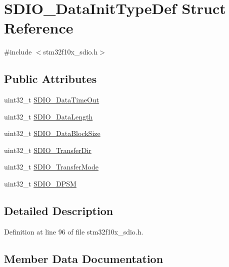 \hypertarget{struct_s_d_i_o___data_init_type_def}{}\section{S\+D\+I\+O\+\_\+\+Data\+Init\+Type\+Def Struct Reference}
\label{struct_s_d_i_o___data_init_type_def}


{\ttfamily \#include $<$stm32f10x\+\_\+sdio.\+h$>$}

\subsection*{Public Attributes}
\begin{DoxyCompactItemize}
\item 
uint32\+\_\+t \hyperlink{struct_s_d_i_o___data_init_type_def_a6877ec1042a273e228114e5362b93aa1}{S\+D\+I\+O\+\_\+\+Data\+Time\+Out}
\item 
uint32\+\_\+t \hyperlink{struct_s_d_i_o___data_init_type_def_ac325889a6dd582130a752aafc3ec9ee9}{S\+D\+I\+O\+\_\+\+Data\+Length}
\item 
uint32\+\_\+t \hyperlink{struct_s_d_i_o___data_init_type_def_a2252d17c4b3182830eb9f400489cb10f}{S\+D\+I\+O\+\_\+\+Data\+Block\+Size}
\item 
uint32\+\_\+t \hyperlink{struct_s_d_i_o___data_init_type_def_a4838fffdb3f87850569dff12f15485db}{S\+D\+I\+O\+\_\+\+Transfer\+Dir}
\item 
uint32\+\_\+t \hyperlink{struct_s_d_i_o___data_init_type_def_a58ac19aaaceb2791d4bbcd30f334dd21}{S\+D\+I\+O\+\_\+\+Transfer\+Mode}
\item 
uint32\+\_\+t \hyperlink{struct_s_d_i_o___data_init_type_def_ad5eb5f3c6fd9e5d4a6664c5cf57d6b03}{S\+D\+I\+O\+\_\+\+D\+P\+SM}
\end{DoxyCompactItemize}


\subsection{Detailed Description}


Definition at line 96 of file stm32f10x\+\_\+sdio.\+h.



\subsection{Member Data Documentation}
\mbox{\label{struct_s_d_i_o___data_init_type_def_a2252d17c4b3182830eb9f400489cb10f}} 
